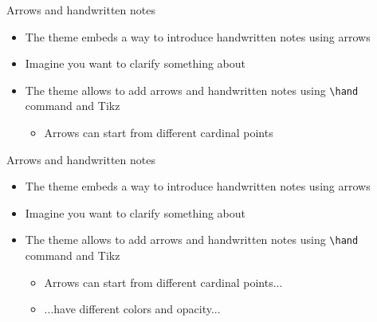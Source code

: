 \documentclass[10pt,itemsep]{beamer}
\begin{document}
\begin{frame}[t]
    {Arrows and handwritten notes}\bigskip
    \begin{itemize}
        \item The theme embeds a way to introduce handwritten notes using arrows \bigskip
        \item Imagine you want to clarify something about  \bigskip
        \item The theme allows to add arrows and handwritten notes using \texttt{\textbackslash hand} command and Tikz
        \begin{itemize}
            \item Arrows can start from different cardinal points 
        \end{itemize}
    \end{itemize}
\end{frame}
\shownotesblock{}

\begin{frame}[t]
    {Arrows and handwritten notes}\bigskip
    \begin{itemize}
        \item The theme embeds a way to introduce handwritten notes using arrows \bigskip
        \item Imagine you want to clarify something about  \bigskip
        \item The theme allows to add arrows and handwritten notes using \texttt{\textbackslash hand} command and Tikz
        \begin{itemize}
            \item Arrows can start from different cardinal points... 
            \item ...have different colors and opacity... 
        \end{itemize}
    \end{itemize}
\end{frame}
\shownotesblock{}
\end{document}
